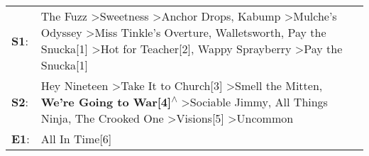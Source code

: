 \begin{supertabular}{p{0.03\textwidth}p{0.92\textwidth}}
 \textbf{S1}:  &  The Fuzz\textsuperscript{} \textgreater \enspace Sweetness\textsuperscript{} \textgreater \enspace Anchor Drops\textsuperscript{}, \enspace Kabump\textsuperscript{} \textgreater \enspace Mulche's Odyssey\textsuperscript{} \textgreater \enspace Miss Tinkle's Overture\textsuperscript{}, \enspace Walletsworth\textsuperscript{}, \enspace Pay the Snucka[1]\textsuperscript{} \textgreater \enspace Hot for Teacher[2]\textsuperscript{}, \enspace Wappy Sprayberry\textsuperscript{} \textgreater \enspace Pay the Snucka[1]\textsuperscript{}  \enspace  \\
 \textbf{S2}:  &                                                                            Hey Nineteen\textsuperscript{} \textgreater \enspace Take It to Church[3]\textsuperscript{} \textgreater \enspace Smell the Mitten\textsuperscript{}, \enspace \textbf{We're Going to War[4]\textsuperscript{$\wedge$}} \textgreater \enspace Sociable Jimmy\textsuperscript{}, \enspace All Things Ninja\textsuperscript{}, \enspace The Crooked One\textsuperscript{} \textgreater \enspace Visions[5]\textsuperscript{} \textgreater \enspace Uncommon\textsuperscript{}  \enspace  \\
 \textbf{E1}:  &                                                                                                                                                                                                                                                                                                                                                                                                                                                                                                                       All In Time[6]\textsuperscript{}  \enspace  \\
\end{supertabular}
